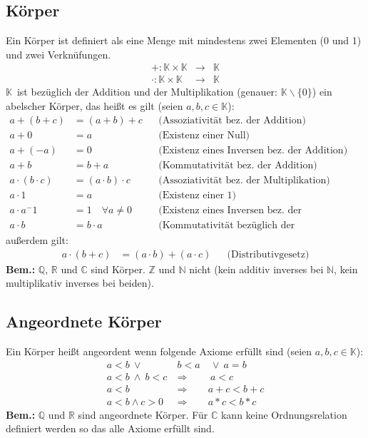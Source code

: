 \documentclass[10pt]{article}
\newcommand{\K}{$\mathbb{K}$}
\newcommand{\N}{\mathbb{N}}
\newcommand{\Z}{\mathbb{Z}}
\newcommand{\Q}{\mathbb{Q}}
\newcommand{\R}{\mathbb{R}}
\newcommand{\C}{\mathbb{C}}
\begin{document}
    \subsection{Körper}
    Ein Körper ist definiert als eine Menge mit mindestens zwei Elementen
    (0 und 1) und zwei Verknüfungen.
    \begin{eqnarray*}
        +: \mathbb{K} \times \mathbb{K} &\rightarrow& \mathbb{K}\\
        \cdot: \mathbb{K} \times \mathbb{K} &\rightarrow& \mathbb{K}
    \end{eqnarray*}
    \K\ ist bezüglich der Addition und der Multiplikation (genauer: $\mathbb{K} \backslash \{0\}$) ein abelscher
    Körper, das heißt es gilt (seien $a,b,c \in \mathbb{K}$):
    \begin{align*}
        a + (b + c) &= (a + b) + c &&\text{(Assoziativität bez.\ der Addition)}\\
        a + 0 &= a &&\text{(Existenz einer Null)}\\
        a + (-a) &= 0 &&\text{(Existenz eines Inversen bez.\ der Addition)}\\
        a + b &= b + a &&\text{(Kommutativität bez.\ der Addition)}\\
        a \cdot (b \cdot c) &= (a \cdot b) \cdot c &&\text{(Assoziativität bez.\ der Multiplikation)}\\
        a \cdot 1 &= a &&\text{(Existenz einer 1)}\\
        a \cdot a^-1 &= 1\quad \forall a \neq 0 &&\text{(Existenz eines Inversen bez.\ der Multiplikation)}\\
        a \cdot b &= b \cdot a &&\text{(Kommutativität bezüglich der Multiplikation)}
    \end{align*}
    außerdem gilt:
    \begin{align*}
        a \cdot (b + c) &= (a \cdot b) + (a \cdot c) &&\text{(Distributivgesetz)}
    \end{align*}
    \textbf{Bem.:}
    $\Q$, $\R$ und $\C$ sind Körper.
    $\Z$ und $\N$ nicht (kein additiv inverses bei $\N$,
    kein multiplikativ inverses bei beiden).


    \subsection{Angeordnete Körper}
    Ein Körper heißt angeordent wenn folgende Axiome erfüllt sind
    (seien $a,b,c \in \mathbb{K}$):
    \begin{eqnarray*}
        a<b\ \vee\ &b<a&\ \vee\ a=b\\
        a<b\ \wedge\ b<c\ &\Rightarrow&\ a<c\\
        a<b &\Rightarrow& a+c<b+c\\
        a<b \wedge c>0 &\Rightarrow& a*c<b*c
    \end{eqnarray*}
    \textbf{Bem.:}
    $\Q$ und $\R$ sind angeordnete Körper. Für $\C$
    kann keine Ordnungsrelation definiert werden so das alle Axiome erfüllt
    sind.
\end{document}
